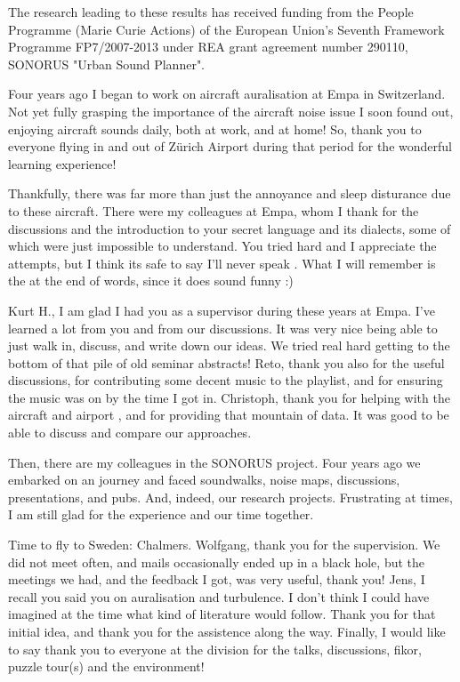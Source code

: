The research leading to these results has received funding from
the People Programme (Marie Curie Actions) of the European Union's Seventh
Framework Programme FP7/2007-2013 under REA grant agreement number 290110,
SONORUS "Urban Sound Planner".

Four years ago I began to work on aircraft auralisation at Empa in Switzerland.
Not yet fully grasping the importance of the aircraft noise issue I soon found
out, enjoying aircraft sounds daily, both
at work, and at home! So, thank you to everyone flying in and out of Z\"{u}rich
Airport during that period for the wonderful learning experience!

Thankfully, there was far more than just the annoyance and sleep disturance due to
these aircraft. There were my colleagues at Empa, whom I thank for the
discussions and the introduction to your secret language and its
dialects, some of which were just impossible to understand. You
tried hard and I appreciate the attempts, but I think its safe to say I'll never
speak . What I will remember is the  at the end of
words, since it does sound funny :)

Kurt H., I am glad I had you as a supervisor during these years at Empa. I've
learned a lot from you and from our discussions. It was very nice being able to
just walk in, discuss, and write down our ideas. We tried real hard getting to
the bottom of that pile of old seminar abstracts! Reto, thank you also for the
useful discussions, for contributing some decent music to the playlist, and for
ensuring the music was on by the time I got in. Christoph, thank you for helping
with the aircraft and airport , and for providing that mountain of
data. It was good to be able to discuss and compare our approaches.

Then, there are my colleagues in the SONORUS project. Four years ago we embarked
on an  journey and faced soundwalks, noise maps,
discussions, presentations, and pubs. And, indeed, our research projects.
Frustrating at times, I am still glad for the experience and our time together.

Time to fly to Sweden: Chalmers. Wolfgang, thank you for the supervision. We did
not meet often, and mails occasionally ended up in a black hole, but the meetings we
had, and the feedback I got, was very useful, thank you! Jens, I recall you said
you  on auralisation and turbulence. I don't think I could have
imagined at the time what kind of literature would follow. Thank you for that
initial idea, and thank you for the assistence along the way. Finally, I would
like to say thank you to everyone at the division for the talks, discussions,
fikor, puzzle tour(s) and the  environment!


%
%
%
